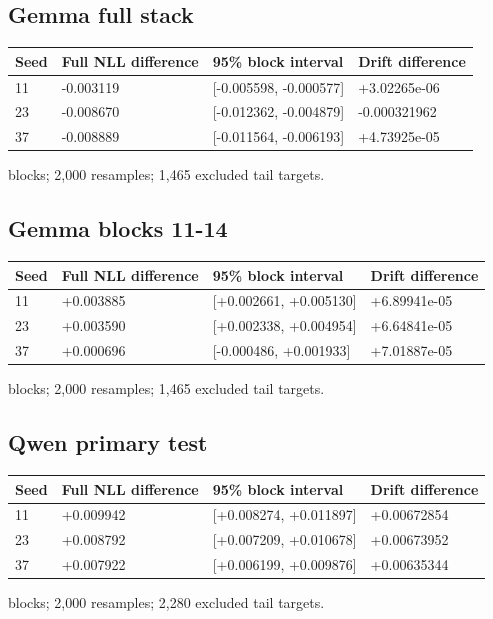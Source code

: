 \documentclass[conference]{IEEEtran}
\begin{document}
\subsection*{Gemma full stack}
{\scriptsize\setlength{\tabcolsep}{2pt}
\noindent\begin{tabular}{@{}p{}p{}p{}p{}@{}}\toprule
Seed & Full NLL difference & 95\% block interval & Drift difference \\\midrule
11 & -0.003119 & [-0.005598, -0.000577] & +3.02265e-06 \\
23 & -0.008670 & [-0.012362, -0.004879] & -0.000321962 \\
37 & -0.008889 & [-0.011564, -0.006193] & +4.73925e-05 \\
\bottomrule\end{tabular}}\par{} blocks; 2,000 resamples; 1,465 excluded tail targets.\par
\subsection*{Gemma blocks 11-14}
{\scriptsize\setlength{\tabcolsep}{2pt}
\noindent\begin{tabular}{@{}p{}p{}p{}p{}@{}}\toprule
Seed & Full NLL difference & 95\% block interval & Drift difference \\\midrule
11 & +0.003885 & [+0.002661, +0.005130] & +6.89941e-05 \\
23 & +0.003590 & [+0.002338, +0.004954] & +6.64841e-05 \\
37 & +0.000696 & [-0.000486, +0.001933] & +7.01887e-05 \\
\bottomrule\end{tabular}}\par{} blocks; 2,000 resamples; 1,465 excluded tail targets.\par
\subsection*{Qwen primary test}
{\scriptsize\setlength{\tabcolsep}{2pt}
\noindent\begin{tabular}{@{}p{}p{}p{}p{}@{}}\toprule
Seed & Full NLL difference & 95\% block interval & Drift difference \\\midrule
11 & +0.009942 & [+0.008274, +0.011897] & +0.00672854 \\
23 & +0.008792 & [+0.007209, +0.010678] & +0.00673952 \\
37 & +0.007922 & [+0.006199, +0.009876] & +0.00635344 \\
\bottomrule\end{tabular}}\par{} blocks; 2,000 resamples; 2,280 excluded tail targets.\par
\end{document}
